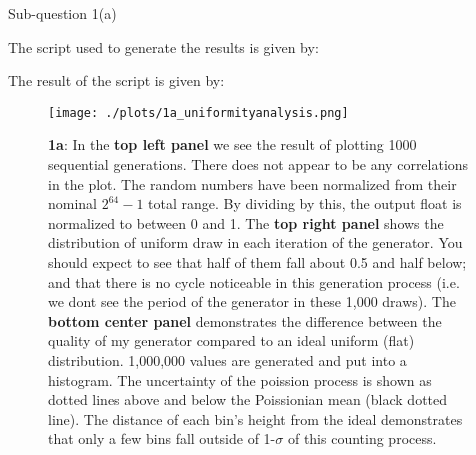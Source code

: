 
\begin{subsection}{Sub-question 1(a)}

The script used to generate the results is given by:
  


The result of the script is given by:




\begin{figure}[h!]
  \centering
  \texttt{[image: ./plots/1a\_uniformityanalysis.png]}
  \caption{\textbf{1a}: In the \textbf{top left panel} we see the result of plotting 1000 sequential generations. There does not appear to be any correlations in the plot. The random numbers have been normalized from their nominal $2^{64}-1$ total range. By dividing by this, the output float is normalized to between 0 and 1. The \textbf{top right panel} shows the distribution of uniform draw in each iteration of the generator. You should expect to see that half of them fall about 0.5 and half below; and that there is no cycle noticeable in this generation process (i.e. we dont see the period of the generator in these 1,000 draws). The \textbf{bottom center panel} demonstrates the difference between the quality of my generator compared to an ideal uniform (flat) distribution. 1,000,000 values are generated and put into a histogram. The uncertainty of the poission process is shown as dotted lines above and below the Poissionian mean (black dotted line). The distance of each bin's height from the ideal demonstrates that only a few bins fall outside of 1-$\sigma$ of this counting process.}
  \label{fig:rngquality}
\end{figure}


\end{subsection}


\FloatBarrier

